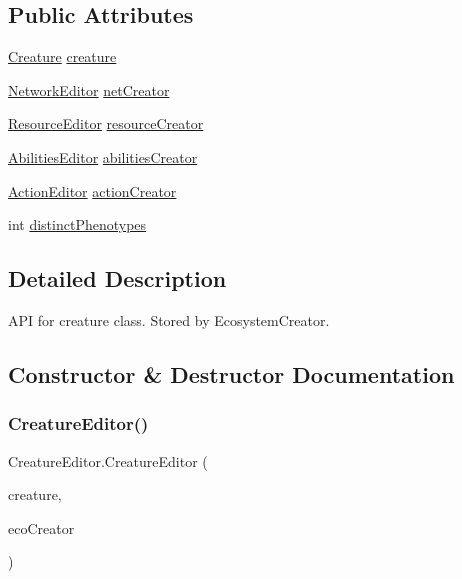 \subsection*{Public Attributes}
\begin{DoxyCompactItemize}
\item 
\mbox{\hyperlink{class_creature}{Creature}} \mbox{\hyperlink{class_creature_editor_a2589284f2064a318bd8578acb95f3309}{creature}}
\item 
\mbox{\hyperlink{class_network_editor}{Network\+Editor}} \mbox{\hyperlink{class_creature_editor_ae6f73bff56b148123b3ca5251bb00aee}{net\+Creator}}
\item 
\mbox{\hyperlink{class_resource_editor}{Resource\+Editor}} \mbox{\hyperlink{class_creature_editor_a61c343493865d7ead92c5ea83fdfe6f5}{resource\+Creator}}
\item 
\mbox{\hyperlink{class_abilities_editor}{Abilities\+Editor}} \mbox{\hyperlink{class_creature_editor_a801504d4a32e2ad56c4c1ffda29d75f6}{abilities\+Creator}}
\item 
\mbox{\hyperlink{class_action_editor}{Action\+Editor}} \mbox{\hyperlink{class_creature_editor_a2bd48e758a2f1db48ad15d765debf5f2}{action\+Creator}}
\item 
int \mbox{\hyperlink{class_creature_editor_af48eb3267dc56b717ed3ba596794a362}{distinct\+Phenotypes}}
\end{DoxyCompactItemize}


\subsection{Detailed Description}
A\+PI for creature class. Stored by Ecosystem\+Creator.

\subsection{Constructor \& Destructor Documentation}
\mbox{\label{class_creature_editor_ad25258b45808b5e140dd76aa7eec7b29}} 
\subsubsection{\texorpdfstring{Creature\+Editor()}{CreatureEditor()}}
{\footnotesize\ttfamily Creature\+Editor.\+Creature\+Editor (\begin{DoxyParamCaption}\item[{\mbox{\hyperlink{class_creature}{Creature}}}]{creature,  }\item[{\mbox{\hyperlink{class_ecosystem_editor}{Ecosystem\+Editor}}}]{eco\+Creator }\end{DoxyParamCaption})}



